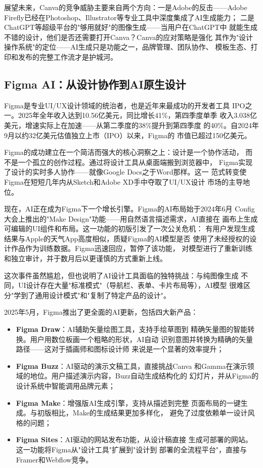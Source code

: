 展望未来，Canva的竞争威胁主要来自两个方向：一是Adobe的反击——Adobe
Firefly已经在Photoshop、Illustrator等专业工具中深度集成了AI生成能力；
二是ChatGPT等超级平台的"够用就好"的图像生成——当用户在ChatGPT中
就能生成不错的设计，他们是否还需要打开Canva？Canva的应对策略是强化
其作为"设计操作系统"的定位——AI生成只是功能之一，品牌管理、团队协作、
模板生态、打印和发布的完整工作流才是护城河。

\subsection{Figma AI：从设计协作到AI原生设计}
\label{subsec:figma-ai}

Figma是专业UI/UX设计领域的统治者，也是近年来最成功的开发者工具
IPO之一。2025年全年收入达到10.56亿美元，同比增长41\%，第四季度单季
收入3.038亿美元，增速实际上在加速——从第二季度的38\%提升到第四季度
的40\%。自2024年9月以约32亿美元估值独立上市（IPO）以来，Figma的
市值已超过150亿美元。

Figma的成功建立在一个简洁而强大的核心洞察之上：设计是一个协作活动，
而不是一个孤立的创作过程。通过将设计工具从桌面端搬到浏览器中，
Figma实现了设计的实时多人协作——就像Google Docs之于Word那样。这一
范式转变使Figma在短短几年内从Sketch和Adobe XD手中夺取了UI/UX设计
市场的主导地位。

现在，AI正在成为Figma下一个增长引擎。Figma的AI布局始于2024年6月
Config大会上推出的"Make Design"功能——用自然语言描述需求，AI直接在
画布上生成可编辑的UI组件和布局。这一功能的初版引发了一次公关危机：
有用户发现生成结果与Apple的天气App高度相似，质疑Figma的AI模型是否
使用了未经授权的设计作品作为训练数据。Figma迅速回应，暂停了该功能，
对模型进行了重新训练和独立审计，并于数月后以更谨慎的方式重新上线。

这次事件虽然尴尬，但也说明了AI设计工具面临的独特挑战：与纯图像生成
不同，UI设计存在大量"标准模式"（导航栏、表单、卡片布局等），AI模型
很难区分"学到了通用设计模式"和"复制了特定产品的设计"。

2025年5月，Figma推出了更全面的AI更新，包括四大新产品：
\begin{itemize}
  \item \textbf{Figma Draw}：AI辅助矢量绘图工具，支持手绘草图到
    精确矢量图的智能转换。用户用数位板画一个粗略的形状，AI自动
    识别意图并转换为精确的矢量路径——这对于插画师和图标设计师
    来说是一个显著的效率提升；
  \item \textbf{Figma Buzz}：AI驱动的演示文稿工具，直接挑战Canva
    和Gamma在演示领域的地位。用户描述演示内容，Buzz自动生成结构化的
    幻灯片，并从Figma的设计系统中智能调用品牌元素；
  \item \textbf{Figma Make}：增强版AI生成引擎，支持从描述到完整
    页面布局的一键生成。与初版相比，Make的生成结果更加多样化，
    避免了过度依赖单一设计风格的问题；
  \item \textbf{Figma Sites}：AI驱动的网站发布功能，从设计稿直接
    生成可部署的网站。这一功能将Figma从"设计工具"扩展到"设计到
    部署的全流程平台"，直接与Framer和Webflow竞争。
\end{itemize}

